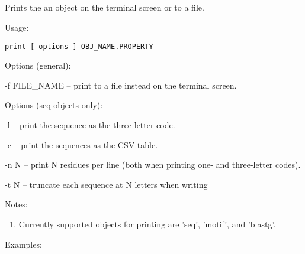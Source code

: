 


\subsection[print]{  }



Prints the an object on the terminal screen or to a file.


\begin{description}


\item{Usage:}

{\tt print [ options ] OBJ\_NAME.PROPERTY}


\item{Options (general):}
\begin{description}
\item -f FILE\_NAME -- print to a file instead on the terminal screen.
\end{description}

\item{Options (seq objects only):}
\begin{description}
\item -l -- print the sequence as the three-letter code.
\item -c -- print the sequences as the CSV table.
\item -n N -- print N residues per line (both when printing one- and
 three-letter codes).
\item -t N -- truncate each sequence at N letters when writing
\end{description}


\item{Notes:}
\begin{enumerate}
\item Currently supported objects for printing are 'seq', 'motif',
and 'blastg'. 
\end{enumerate}


\item{Examples:}
\begin{enumerate}


\end{enumerate}
\end{description}
